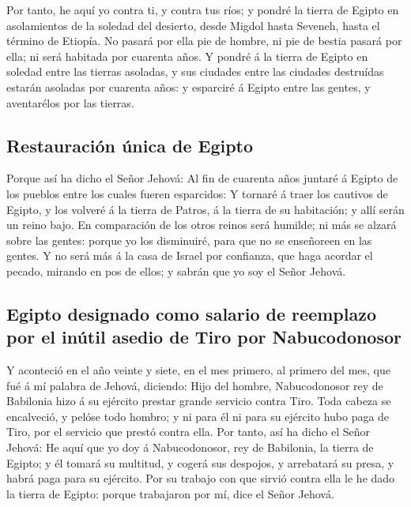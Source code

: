  Por tanto, he aquí yo contra ti, y contra tus ríos; y
pondré la tierra de Egipto en asolamientos de la soledad del desierto,
desde Migdol hasta Seveneh, hasta el término de Etiopía. 
No pasará por ella pie de hombre, ni pie de bestia pasará por ella; ni
será habitada por cuarenta años.  Y pondré á la tierra de
Egipto en soledad entre las tierras asoladas, y sus ciudades entre las
ciudades destruídas estarán asoladas por cuarenta años: y esparciré á
Egipto entre las gentes, y aventarélos por las tierras.

\hypertarget{restauraciuxf3n-uxfanica-de-egipto}{%
\subsection{Restauración única de
Egipto}\label{restauraciuxf3n-uxfanica-de-egipto}}

 Porque así ha dicho el Señor Jehová: Al fin de cuarenta
años juntaré á Egipto de los pueblos entre los cuales fueren esparcidos:
 Y tornaré á traer los cautivos de Egipto, y los volveré á
la tierra de Patros, á la tierra de su habitación; y allí serán un reino
bajo.  En comparación de los otros reinos será humilde; ni
más se alzará sobre las gentes: porque yo los disminuiré, para que no se
enseñoreen en las gentes.  Y no será más á la casa de
Israel por confianza, que haga acordar el pecado, mirando en pos de
ellos; y sabrán que yo soy el Señor Jehová.

\hypertarget{egipto-designado-como-salario-de-reemplazo-por-el-inuxfatil-asedio-de-tiro-por-nabucodonosor}{%
\subsection{Egipto designado como salario de reemplazo por el inútil
asedio de Tiro por
Nabucodonosor}\label{egipto-designado-como-salario-de-reemplazo-por-el-inuxfatil-asedio-de-tiro-por-nabucodonosor}}

 Y aconteció en el año veinte y siete, en el mes primero,
al primero del mes, que fué á mí palabra de Jehová, diciendo:
 Hijo del hombre, Nabucodonosor rey de Babilonia hizo á su
ejército prestar grande servicio contra Tiro. Toda cabeza se encalveció,
y pelóse todo hombro; y ni para él ni para su ejército hubo paga de
Tiro, por el servicio que prestó contra ella.  Por tanto,
así ha dicho el Señor Jehová: He aquí que yo doy á Nabucodonosor, rey de
Babilonia, la tierra de Egipto; y él tomará su multitud, y cogerá sus
despojos, y arrebatará su presa, y habrá paga para su ejército.
 Por su trabajo con que sirvió contra ella le he dado la
tierra de Egipto: porque trabajaron por mí, dice el Señor Jehová.

